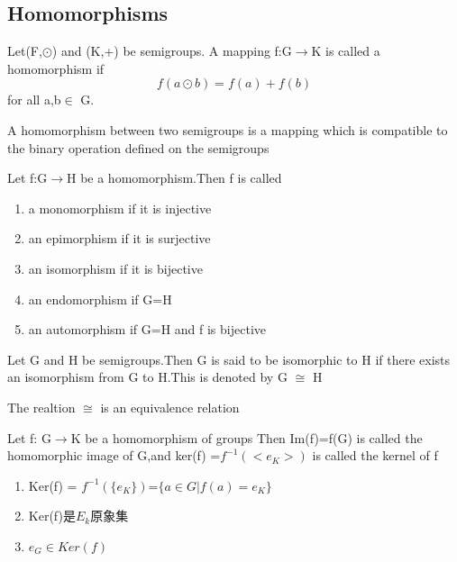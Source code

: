 \documentclass[cn,10pt,math=newtx,citestyle=gb7714-2015,bibstyle=gb7714-2015]{elegantbook}
\begin{document}
\subsection{Homomorphisms}
\begin{definition}
    Let(F,$\odot$) and (K,+) be semigroups.
    A mapping f:G$\to$K is called a homomorphism if \begin{equation*}
        f(a\odot b)=f(a)+f(b)
    \end{equation*}
    for all a,b$\in$ G.
\end{definition}
\begin{remark}
    A homomorphism between two semigroups is a mapping which is compatible to the binary operation defined on the semigroups
\end{remark}

\begin{definition}
    Let f:G$\to$H be a homomorphism.Then f is called
    \begin{enumerate}
        \item a monomorphism if it is injective
        \item an epimorphism if it is surjective
        \item an isomorphism if it is bijective
        \item an endomorphism if G=H
        \item an automorphism if G=H and f is bijective
    \end{enumerate}
\end{definition}
\begin{definition}
    Let G and H be semigroups.Then G is said to be isomorphic to H if there exists an isomorphism from G to H.This is denoted by G $\cong$ H
\end{definition}
\begin{note}
    The realtion $\cong$ is an equivalence relation
\end{note}
\begin{definition}
   Let f: G$\to$K be a homomorphism of groups Then Im(f)=f(G) is called the homomorphic image of G,and ker(f) =$f^{-1}(<e_K>)$ is called the kernel of f 

    \begin{enumerate}
        \item Ker(f) = $f^{-1}(\{e_K\})$=$\{a\in G|f(a)=e_K\}$
        \item Ker(f)是$E_k$原象集
        \item $e_G \in Ker(f)$
    \end{enumerate}
\end{definition}
\end{document}
